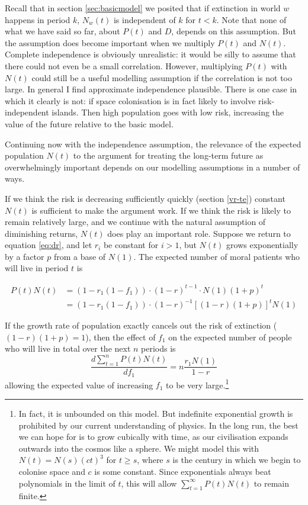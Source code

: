 \documentclass[british]{article}
\begin{document}
Recall that in section \ref{sec:basicmodel} we posited that if extinction in world $w$ happens in period $k$, $N_w(t)$ is independent of $k$ for $t<k$. Note that none of what we have said so far, about $P(t)$ and $D$, depends on this assumption. But the assumption does become important when we multiply $P(t)$ and $N(t)$. Complete independence is obviously unrealistic: it would be silly to assume that there could not even be a small correlation. However, multiplying $P(t)$ with $N(t)$ could still be a useful modelling assumption if the correlation is not too large. In general I find approximate independence plausible. There is one case in which it clearly is not: if space colonisation is in fact likely to involve risk-independent islands. Then high population goes with low risk, increasing the value of the future relative to the basic model.

Continuing now with the independence assumption, the relevance of the expected population $N(t)$ to the argument for treating the long-term future as overwhelmingly important depends on our modelling assumptions in a number of ways.

If we think the risk is decreasing sufficiently quickly (section \ref{vr-te}) constant $N(t)$ is sufficient to make the argument work. If we think the risk is likely to remain relatively large, and we continue with the natural assumption of diminishing returns, $N(t)$ does play an important role. Suppose we return to equation \ref{eq:dr}, and let $r_i$ be constant for $i>1$, but $N(t)$ grows exponentially by a factor $p$ from a base of $N(1)$. The expected number of moral patients who will live in period $t$ is

\begin{equation}
\begin{split}
P(t)N(t) &= (1-r_1(1-f_1)) \cdot (1-r)^{t-1} \cdot N(1)(1+p)^t \label{eq:populationgrowth}\\
         &=  (1-r_1(1-f_1)) \cdot (1-r)^{-1}[(1-r)(1+p)]^{t} N(1)
\end{split}
\end{equation}

If the growth rate of population exactly cancels out the risk of extinction ($(1-r)(1+p) = 1$), then the effect of $f_1$ on the expected number of people who will live in total over the next $n$ periods is  
$$\frac{d\sum_{t=1}^n P(t)N(t)}{df_1} = n\frac{r_1N(1)}{1-r}$$
allowing the expected value of increasing $f_1$ to be very large.\footnote{In fact, it is unbounded on this model. But indefinite exponential growth is prohibited by our current understanding of physics. In the long run, the best we can hope for is to grow cubically with time, as our civilisation expands outwards into the cosmos like a sphere. We might model this with $N(t)=N(s)(ct)^3$ for $t\geq s$, where $s$ is the century in which we begin to colonise space and $c$ is some constant. Since exponentials always beat polynomials in the limit of $t$, this will allow $\sum_{t=1}^\infty P(t)N(t)$ to remain finite.}
\end{document}
